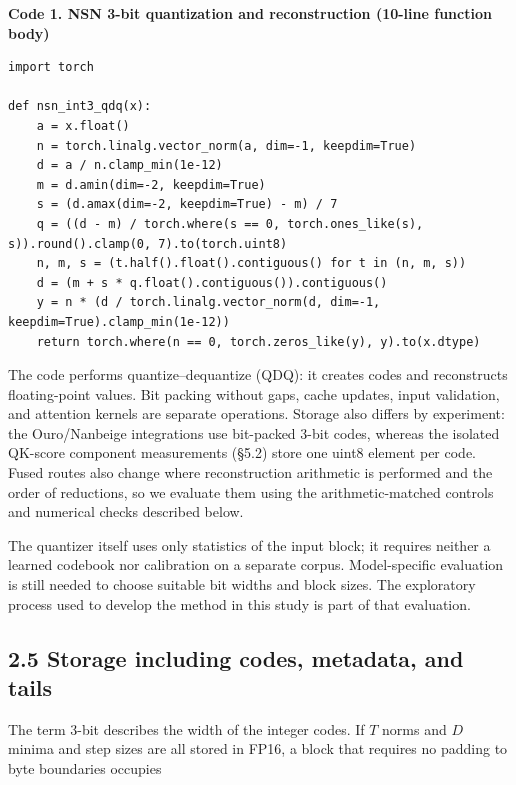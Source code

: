 \documentclass[10pt,a4paper]{article}
\begin{document}
\textbf{Code 1. NSN 3-bit quantization and reconstruction (10-line function body)}

\noindent\begin{minipage}{\linewidth}
\begin{verbatim}
import torch

def nsn_int3_qdq(x):
    a = x.float()
    n = torch.linalg.vector_norm(a, dim=-1, keepdim=True)
    d = a / n.clamp_min(1e-12)
    m = d.amin(dim=-2, keepdim=True)
    s = (d.amax(dim=-2, keepdim=True) - m) / 7
    q = ((d - m) / torch.where(s == 0, torch.ones_like(s), s)).round().clamp(0, 7).to(torch.uint8)
    n, m, s = (t.half().float().contiguous() for t in (n, m, s))
    d = (m + s * q.float().contiguous()).contiguous()
    y = n * (d / torch.linalg.vector_norm(d, dim=-1, keepdim=True).clamp_min(1e-12))
    return torch.where(n == 0, torch.zeros_like(y), y).to(x.dtype)
\end{verbatim}
\end{minipage}\par

The code performs quantize--dequantize (QDQ): it creates codes and reconstructs floating-point values. Bit packing without gaps, cache updates, input validation, and attention kernels are separate operations. Storage also differs by experiment: the Ouro/Nanbeige integrations use bit-packed 3-bit codes, whereas the isolated QK-score component measurements (§5.2) store one uint8 element per code. Fused routes also change where reconstruction arithmetic is performed and the order of reductions, so we evaluate them using the arithmetic-matched controls and numerical checks described below.

The quantizer itself uses only statistics of the input block; it requires neither a learned codebook nor calibration on a separate corpus. Model-specific evaluation is still needed to choose suitable bit widths and block sizes. The exploratory process used to develop the method in this study is part of that evaluation.

\subsection{2.5 Storage including codes, metadata, and tails}\label{storage-including-codes-metadata-and-tails}

The term 3-bit describes the width of the integer codes. If \(T\) norms and \(D\) minima and step sizes are all stored in FP16, a block that requires no padding to byte boundaries occupies
\end{document}

